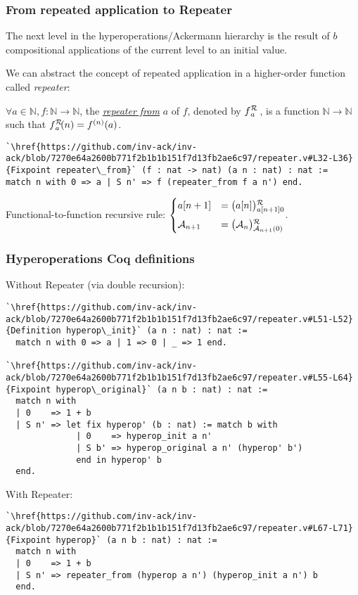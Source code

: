 \begin{frame}[fragile]
\frametitle{From repeated application to Repeater}
The next level in the hyperoperations/Ackermann hierarchy is the result of $b$ compositional applications of the current level to an initial value.

\bigskip

We can abstract the concept of repeated application in a higher-order function called \emph{repeater}:

\smallskip

$\forall a\in \mathbb{N}, f: \mathbb{N}\to \mathbb{N}$, the
\href{https://github.com/inv-ack/inv-ack/blob/7270e64a2600b771f2b1b1b151f7d13fb2ae6c97/repeater.v\#L32-L36}{\emph{repeater from}}
$a$ of $f$, denoted by $\rf{f}{a}$ , is a function $\mathbb{N}\to \mathbb{N}$ such that $\rf{f}{a}(n) = f^{(n)}(a)$.

\begin{lstlisting}
`\href{https://github.com/inv-ack/inv-ack/blob/7270e64a2600b771f2b1b1b151f7d13fb2ae6c97/repeater.v#L32-L36}{Fixpoint repeater\_from}` (f : nat -> nat) (a n : nat) : nat :=
match n with 0 => a | S n' => f (repeater_from f a n') end.
\end{lstlisting}

\smallskip

Functional-to-function recursive rule:
$\begin{cases}
\displaystyle a[n+1] & = \rf{\big(a[n]\big)}{a[n+1]0} \\[5pt]
\Ack_{n+1} & = \rf{\big(\Ack_n\big)}{\Ack_{n+1}(0)}
\end{cases}$.

\end{frame}


\begin{frame}[fragile]
\frametitle{Hyperoperations Coq definitions}
Without Repeater (via double recursion):
\begin{lstlisting}
`\href{https://github.com/inv-ack/inv-ack/blob/7270e64a2600b771f2b1b1b151f7d13fb2ae6c97/repeater.v#L51-L52}{Definition hyperop\_init}` (a n : nat) : nat :=
  match n with 0 => a | 1 => 0 | _ => 1 end.

`\href{https://github.com/inv-ack/inv-ack/blob/7270e64a2600b771f2b1b1b151f7d13fb2ae6c97/repeater.v#L55-L64}{Fixpoint hyperop\_original}` (a n b : nat) : nat :=
  match n with
  | 0    => 1 + b
  | S n' => let fix hyperop' (b : nat) := match b with
              | 0    => hyperop_init a n'
              | S b' => hyperop_original a n' (hyperop' b')
              end in hyperop' b
  end.
\end{lstlisting}

With Repeater:
\begin{lstlisting} 
`\href{https://github.com/inv-ack/inv-ack/blob/7270e64a2600b771f2b1b1b151f7d13fb2ae6c97/repeater.v#L67-L71}{Fixpoint hyperop}` (a n b : nat) : nat :=
  match n with
  | 0    => 1 + b
  | S n' => repeater_from (hyperop a n') (hyperop_init a n') b
  end.
\end{lstlisting}
\end{frame}


